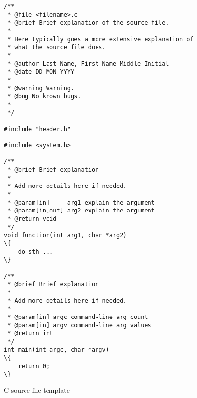 \begin{figure}[htp]
	
\begin{vcode}
\begin{Verbatim}[frame=single,framesep=2mm,commandchars=\\\{\}]			
/**
 * @file <filename>.c
 * @brief Brief explanation of the source file.
 * 
 * Here typically goes a more extensive explanation of
 * what the source file does.
 * 
 * @author Last Name, First Name Middle Initial
 * @date DD MON YYYY
 * 
 * @warning Warning.
 * @bug No known bugs.
 * 
 */

#include "header.h"

#include <system.h>

/**
 * @brief Brief explanation
 * 
 * Add more details here if needed.
 * 
 * @param[in]     arg1 explain the argument
 * @param[in,out] arg2 explain the argument
 * @return void
 */
void function(int arg1, char *arg2)
\{
    do sth ...
\}

/**
 * @brief Brief explanation
 * 
 * Add more details here if needed.
 * 
 * @param[in] argc command-line arg count
 * @param[in] argv command-line arg values
 * @return int
 */
int main(int argc, char *argv)
\{
    return 0;
\}

\end{Verbatim}
\end{vcode}

\caption{C source file template}
\label{fig:source_template}
\end{figure}
